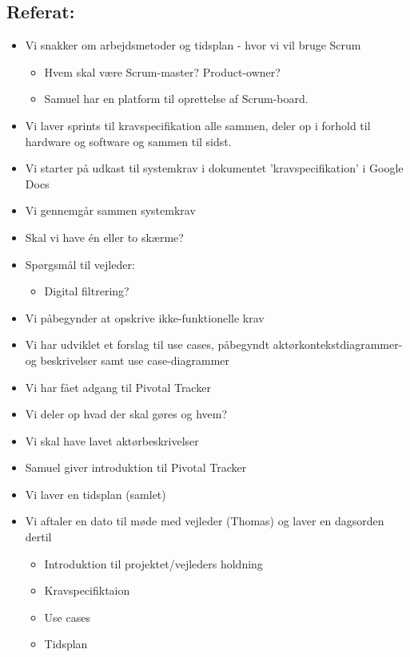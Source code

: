 \documentclass[a4paper,11pt,oneside]{memoir}
\begin{document}
\subsection{Referat:}
\begin{itemize}
\item Vi snakker om arbejdsmetoder og tidsplan - hvor vi vil bruge Scrum 
\begin{itemize}
\item Hvem skal være Scrum-master? Product-owner?
\item Samuel har en platform til oprettelse af Scrum-board.
\end{itemize}
\item Vi laver sprints til kravspecifikation alle sammen, deler op i forhold til hardware og software og sammen til sidst.
\item Vi starter på udkast til systemkrav i dokumentet 'kravspecifikation' i Google Docs
\item Vi gennemgår sammen systemkrav
\item Skal vi have én eller to skærme?
\item Spørgsmål til vejleder:
\begin{itemize}
\item Digital filtrering?
\end{itemize}
\item Vi påbegynder at opskrive ikke-funktionelle krav
\item Vi har udviklet et forslag til use cases, påbegyndt aktørkontekstdiagrammer- og beskrivelser samt use case-diagrammer
\item Vi har fået adgang til Pivotal Tracker
\item Vi deler op hvad der skal gøres og hvem? 
\item Vi skal have lavet aktørbeskrivelser 
\item Samuel giver introduktion til Pivotal Tracker
\item Vi laver en tidsplan (samlet)
\item Vi aftaler en dato til møde med vejleder (Thomas) og laver en dagsorden dertil 
\begin{itemize}
\item Introduktion til projektet/vejleders holdning
\item Kravspecifiktaion
\item Use cases
\item Tidsplan
\end{itemize}
\end{itemize}
\end{document}
